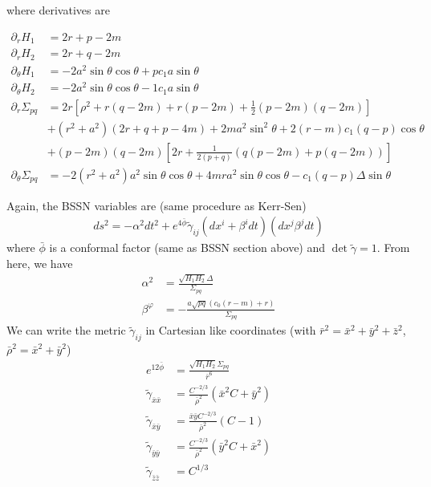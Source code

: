 \documentclass[%
 reprint,
 amsmath,amssymb,
 aps,
]{revtex4-1}
\begin{document}
where derivatives are	
\begin{widetext}
\begin{align}
\partial_r H_1 &= 2r+p-2m \\
\partial_r H_2 &= 2r+q-2m \\
\partial_\theta H_1 &= -2a^2 \sin \theta \cos \theta + p c_1 a \sin \theta \\
\partial_\theta H_2 &= -2a^2 \sin \theta \cos \theta - 1 c_1 a \sin \theta \\
\partial_r \Sigma_{pq} &= 2r \left[\rho^2 + r(q-2m) + r(p-2m) + \frac{1}{2} (p-2m)(q-2m) \right] \nonumber \\
					&+(r^2 + a^2)(2r+q+p-4m) + 2ma^2 \sin^2 \theta + 2(r-m)c_1(q-p) \cos \theta \nonumber \\
					&+(p-2m)(q-2m) \left[2r + \frac{1}{2(p+q)} (q(p-2m) + p(q-2m)) \right] \\
\partial_\theta \Sigma_{pq} &= -2(r^2+a^2) a^2 \sin \theta \cos \theta  + 4mra^2 \sin \theta \cos \theta - c_1(q-p) \Delta \sin \theta
\end{align}
\end{widetext}
Again, the BSSN variables are (same procedure as Kerr-Sen)
\begin{align}
ds^2 = -\alpha^2 dt^2 +e^{4\bar{\phi}} \tilde{\gamma}_{ij} (dx^i + \beta^i dt)(dx^j \beta^j dt)
\end{align}
where $\bar{\phi}$ is a conformal factor (same as BSSN section above) and $\det \tilde{\gamma} = 1$. From here, we have
\begin{align}
\alpha^2 &= \frac{\sqrt{H_1 H_2} \Delta}{\Sigma_{pq}} \\
\beta^{\varphi} &= - \frac{a \sqrt{pq} (c_0 (r-m) + r)}{\Sigma_{pq}}
\end{align}
We can write the metric $\tilde{\gamma}_{ij}$ in Cartesian like coordinates (with $\bar{r}^2 = \bar{x}^2+\bar{y}^2 + \bar{z}^2$, $\bar{\rho}^2= \bar{x}^2+\bar{y}^2$)
\begin{align}
e^{12 \bar{\phi}} &= \frac{\sqrt{H_1 H_2} \Sigma_{pq}}{\bar{r}^6} \\
\tilde{\gamma}_{\bar{x} \bar{x}} &=\frac{C^{-2/3}}{\bar{\rho}^2} (\bar{x}^2 C + \bar{y}^2) \\
\tilde{\gamma}_{\bar{x} \bar{y}} &=\frac{\bar{x} \bar{y} C^{-2/3}}{\bar{\rho}^2} (C-1) \\
\tilde{\gamma}_{\bar{y} \bar{y}} &=\frac{C^{-2/3}}{\bar{\rho}^2} (\bar{y}^2 C + \bar{x}^2)\\
\tilde{\gamma}_{\bar{z} \bar{z}} &=C^{1/3}
\end{align}
\end{document}
